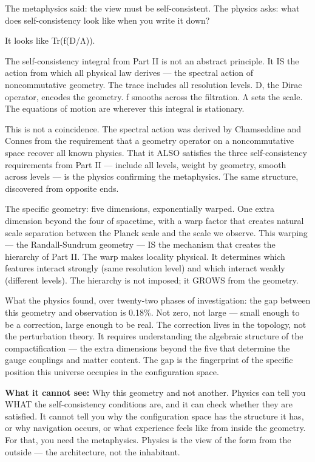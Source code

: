 The metaphysics said: the view must be self-consistent. The physics asks: what does self-consistency look like when you write it down?


It looks like Tr(f(D/Λ)).


The self-consistency integral from Part II is not an abstract principle. It IS the action from which all physical law derives — the spectral action of noncommutative geometry. The trace includes all resolution levels. D, the Dirac operator, encodes the geometry. f smooths across the filtration. Λ sets the scale. The equations of motion are wherever this integral is stationary.


This is not a coincidence. The spectral action was derived by Chamseddine and Connes from the requirement that a geometry operator on a noncommutative space recover all known physics. That it ALSO satisfies the three self-consistency requirements from Part II — include all levels, weight by geometry, smooth across levels — is the physics confirming the metaphysics. The same structure, discovered from opposite ends.


The specific geometry: five dimensions, exponentially warped. One extra dimension beyond the four of spacetime, with a warp factor that creates natural scale separation between the Planck scale and the scale we observe. This warping — the Randall-Sundrum geometry — IS the mechanism that creates the hierarchy of Part II. The warp makes locality physical. It determines which features interact strongly (same resolution level) and which interact weakly (different levels). The hierarchy is not imposed; it GROWS from the geometry.


What the physics found, over twenty-two phases of investigation: the gap between this geometry and observation is 0.18\%. Not zero, not large — small enough to be a correction, large enough to be real. The correction lives in the topology, not the perturbation theory. It requires understanding the algebraic structure of the compactification — the extra dimensions beyond the five that determine the gauge couplings and matter content. The gap is the fingerprint of the specific position this universe occupies in the configuration space.


\textbf{What it cannot see:} Why this geometry and not another. Physics can tell you WHAT the self-consistency conditions are, and it can check whether they are satisfied. It cannot tell you why the configuration space has the structure it has, or why navigation occurs, or what experience feels like from inside the geometry. For that, you need the metaphysics. Physics is the view of the form from the outside — the architecture, not the inhabitant.


